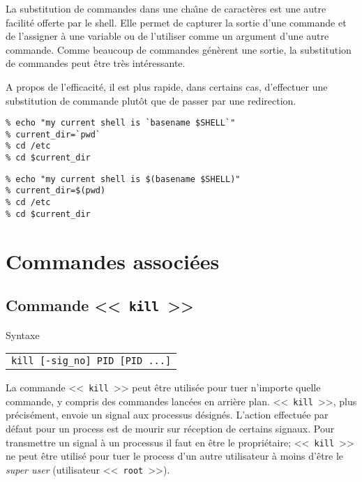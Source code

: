La substitution de commandes dans une cha{\^\i}ne de caract{\`e}res est une autre facilit{\'e} offerte par le shell. Elle permet de capturer la sortie d'une commande et de l'assigner {\`a} une variable ou de l'utiliser comme un argument d'une autre commande. Comme beaucoup de commandes {\Unix} g{\'e}n{\`e}rent une sortie, la substitution de commandes peut {\^e}tre tr{\`e}s int{\'e}ressante.

A propos de l'efficacit{\'e}, il est plus rapide, dans certains cas, d'effectuer une substitution de commande plut{\^o}t que de passer par une redirection.

\begin{example}
\begin{verbatim}
% echo "my current shell is `basename $SHELL`"
% current_dir=`pwd`
% cd /etc
% cd $current_dir
\end{verbatim}

\begin{verbatim}
% echo "my current shell is $(basename $SHELL)"
% current_dir=$(pwd)
% cd /etc
% cd $current_dir
\end{verbatim}
\end{example}


\section{Commandes associ{\'e}es}

\subsection{\label{multi-task-kill}Commande <<~{\tt kill}~>>}

\begin{definition}{Syntaxe}
\begin{tabular}{@{\hspace{1cm}}l}
	{\tt kill [-sig\_no] PID [PID ...]}\\[0.2cm]
\end{tabular}
\end{definition}

La commande <<~\texttt{kill}~>> peut {\^e}tre utilis{\'e}e pour tuer n'importe quelle commande, y compris des commandes lanc{\'e}es en arri{\`e}re plan. <<~{\tt kill}~>>, plus pr{\'e}cis{\'e}ment, envoie un signal aux processus d{\'e}sign{\'e}s. L'action effectu{\'e}e par d{\'e}faut pour un process est de mourir sur r{\'e}ception de certains signaux. Pour transmettre un signal {\`a} un processus il faut en {\^e}tre le propri{\'e}taire; <<~{\tt kill}~>> ne peut {\^e}tre utilis{\'e} pour tuer le process d'un autre utilisateur {\`a} moins d'{\^e}tre le {\sl super user} (utilisateur <<~{\tt root}~>>).

